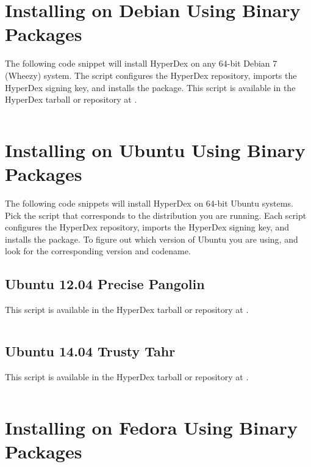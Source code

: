 \section{Installing on Debian Using Binary Packages}

The following code snippet will install HyperDex on any 64-bit Debian 7 (Wheezy)
system.  The script configures the HyperDex repository, imports the HyperDex
signing key, and installs the  package.  This script is available
in the HyperDex tarball or repository at .

\inputminted[frame=lines,framesep=2mm,firstline=5]{bash}{\topdir/install/debian7-packages.sh}

\section{Installing on Ubuntu Using Binary Packages}

The following code snippets will install HyperDex on 64-bit Ubuntu systems.
Pick the script that corresponds to the distribution you are running.  Each
script configures the HyperDex repository, imports the HyperDex signing key, and
installs the  package.  To figure out which version of Ubuntu you
are using,  and look for the corresponding version and
codename.

\subsection{Ubuntu 12.04 Precise Pangolin}

This script is available in the HyperDex tarball or repository at
.

\inputminted[frame=lines,framesep=2mm,firstline=5]{bash}{\topdir/install/ubuntu12.04-packages.sh}

\subsection{Ubuntu 14.04 Trusty Tahr}

This script is available in the HyperDex tarball or repository at
.

\inputminted[frame=lines,framesep=2mm,firstline=5]{bash}{\topdir/install/ubuntu14.04-packages.sh}

\section{Installing on Fedora Using Binary Packages}

